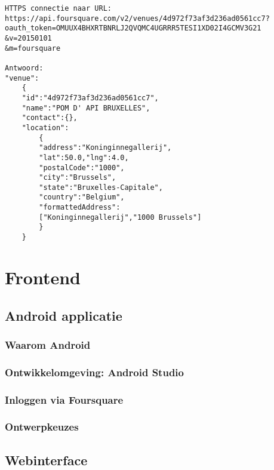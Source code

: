 \begin{lstlisting}[caption={Voorbeeld: werking Foursquare API},label=lst:vb_foursquare_api]
HTTPS connectie naar URL:
https://api.foursquare.com/v2/venues/4d972f73af3d236ad0561cc7?
oauth_token=OMUUX4BHXRTBNRLJ2QVQMC4UGRRR5TESI1XD02I4GCMV3G21
&v=20150101
&m=foursquare

Antwoord:
"venue":
	{
	"id":"4d972f73af3d236ad0561cc7",
	"name":"POM D' API BRUXELLES",
	"contact":{},
	"location":
		{
		"address":"Koninginnegallerij",
		"lat":50.0,"lng":4.0,
		"postalCode":"1000",
		"city":"Brussels",
		"state":"Bruxelles-Capitale",
		"country":"Belgium",
		"formattedAddress":
		["Koninginnegallerij","1000 Brussels"]
		}
	}
\end{lstlisting}
 


\section{Frontend}
\subsection{Android applicatie}
\subsubsection{Waarom Android}
% 
\subsubsection{Ontwikkelomgeving: Android Studio}
\subsubsection{Inloggen via Foursquare}

\subsubsection{Ontwerpkeuzes}

\subsection{Webinterface}
